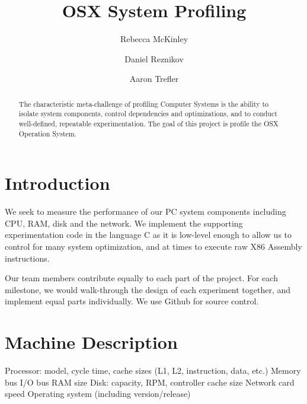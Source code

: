 \documentclass[sigconf]{acmart}
\begin{document}
\title{OSX System Profiling}

\author{Rebecca McKinley}

\author{Daniel Reznikov}


\author{Aaron Trefler}

\begin{abstract}
The characteristic meta-challenge of profiling Computer Systems is the ability to isolate system components, control dependencies and optimizations, and to conduct well-defined, repeatable experimentation. The goal of this project is profile the OSX Operation System.
\end{abstract}

\maketitle

\section{Introduction}
We seek to measure the performance of our PC system components including CPU, RAM, disk and the network. We implement the supporting experimentation code in the language C as it is low-level enough to allow us to control for many system optimization, and at times to execute raw X86 Assembly instructions.

Our team members contribute equally to each part of the project. For each milestone, we would walk-through the design of each experiment together, and implement equal parts individually. We use Github for source control.


\section{Machine Description}

Processor: model, cycle time, cache sizes (L1, L2, instruction, data, etc.)
Memory bus
I/O bus
RAM size
Disk: capacity, RPM, controller cache size
Network card speed
Operating system (including version/release)
\end{document}
